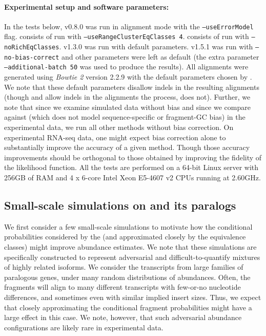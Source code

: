 \paragraph{Experimental setup and software parameters:}
In the tests below, \salmon v0.8.0 was run in alignment mode with the
\texttt{--useErrorModel} flag. \salrf consists of \salmon run with
\texttt{--useRangeClusterEqClasses 4}. \salu consists of \salmon run with
\texttt{--noRichEqClasses}. \rsem v1.3.0 was run with default parameters.
\express v1.5.1 was run with \texttt{--no-bias-correct} and other parameters
were left as default (the extra parameter \texttt{--additional-batch 50} was
used to produce the \expressEM results). All alignments were generated using
\emph{Bowtie 2} version 2.2.9 with the default parameters chosen by \rsem. We
note that these default parameters disallow indels in the resulting alignments
(though \salmon and \express allow indels in the alignments the process, \rsem
does not). Further, we note that since we examine simulated data without bias
and since we compare against \rsem (which does not model sequence-specific or
fragment-GC bias) in the experimental data, we run all other methods without
bias correction. On experimental RNA-seq data, one might expect bias correction
alone to substantially improve the accuracy of a given method. Though those
accuracy improvements should be orthogonal to those obtained by improving the
fidelity of the likelihood function. All the tests are performed on a 64-bit
Linux server with 256GB of RAM and 4 x 6-core Intel Xeon E5-4607 v2 CPUs running
at 2.60GHz.


\subsection{Small-scale simulations on  and its paralogs}
\label{res:smallscale}
We first consider a few small-scale simulations to motivate how the conditional
probabilities considered by the \fm (and approximated closely by the \rangebased
equivalence classes) might improve abundance estimates. We note that these
simulations are specifically constructed to represent adversarial and
difficult-to-quantify mixtures of highly related isoforms. We consider the
transcripts from large families of paralogous genes, under many random
distributions of abundances. Often, the fragments will align to many different
transcripts with few-or-no nucleotide differences, and sometimes even with
similar implied insert sizes. Thus, we expect that closely approximating the
conditional fragment probabilities might have a large effect in this case. We
note, however, that such adversarial abundance configurations are likely rare in
experimental data.

